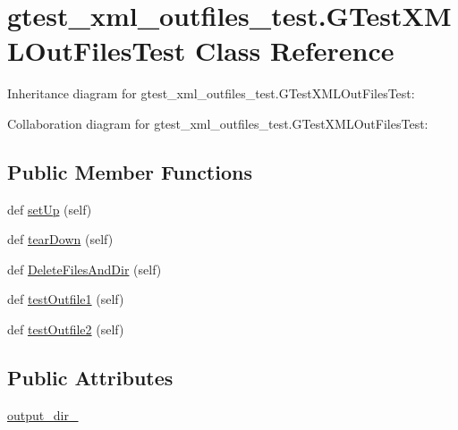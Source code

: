 \hypertarget{classgtest__xml__outfiles__test_1_1_g_test_x_m_l_out_files_test}{}\section{gtest\+\_\+xml\+\_\+outfiles\+\_\+test.\+G\+Test\+X\+M\+L\+Out\+Files\+Test Class Reference}
\label{classgtest__xml__outfiles__test_1_1_g_test_x_m_l_out_files_test}


Inheritance diagram for gtest\+\_\+xml\+\_\+outfiles\+\_\+test.\+G\+Test\+X\+M\+L\+Out\+Files\+Test\+:


Collaboration diagram for gtest\+\_\+xml\+\_\+outfiles\+\_\+test.\+G\+Test\+X\+M\+L\+Out\+Files\+Test\+:
\subsection*{Public Member Functions}
\begin{DoxyCompactItemize}
\item 
def \hyperlink{classgtest__xml__outfiles__test_1_1_g_test_x_m_l_out_files_test_a56550f293277d18c36e868a637fe1153}{set\+Up} (self)
\item 
def \hyperlink{classgtest__xml__outfiles__test_1_1_g_test_x_m_l_out_files_test_a49d1d410370ba8a3cfcc281eaadb5706}{tear\+Down} (self)
\item 
def \hyperlink{classgtest__xml__outfiles__test_1_1_g_test_x_m_l_out_files_test_a503d2fbc9cd782ae57ac4307d2db43e1}{Delete\+Files\+And\+Dir} (self)
\item 
def \hyperlink{classgtest__xml__outfiles__test_1_1_g_test_x_m_l_out_files_test_a034738bbc00ac46d00f183402c561228}{test\+Outfile1} (self)
\item 
def \hyperlink{classgtest__xml__outfiles__test_1_1_g_test_x_m_l_out_files_test_a3c02687f092a482d0d0260c7ed94c618}{test\+Outfile2} (self)
\end{DoxyCompactItemize}
\subsection*{Public Attributes}
\begin{DoxyCompactItemize}
\item 
\hyperlink{classgtest__xml__outfiles__test_1_1_g_test_x_m_l_out_files_test_aa5c31cd97047bc1d3060f4d27bc956a4}{output\+\_\+dir\+\_\+}
\end{DoxyCompactItemize}
